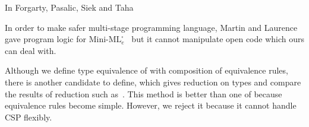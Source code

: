 In Forgarty, Pasalic, Siek and Taha~\cite{fogarty2007concoqtion}

In order to make safer multi-stage programming language, 
Martin and Laurence~\cite{martin2015HGRTMP} gave program logic for
\(\text{Mini-ML}^\square_e\)~\cite{DaviesPfenning01JACM} but
it cannot manipulate open code which ours can deal with. 


Although we define type equivalence of \LMD with composition of equivalence
rules, there is another candidate to define, which gives reduction on types
and compare the results of reduction such as~\cite{sorensen2006lectures}.
This method is better than one of \LMD because equivalence rules become
simple. However, we reject it because it cannot handle CSP flexibly.
